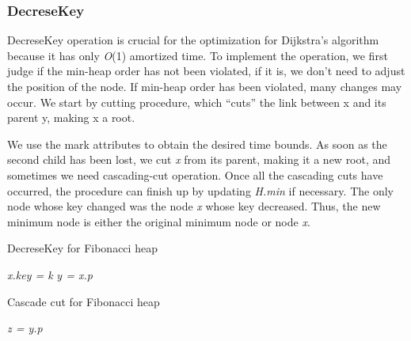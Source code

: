 \documentclass[12pt]{article}
\begin{document}
    \subsubsection{DecreseKey}
    DecreseKey operation is crucial for the optimization for Dijkstra's algorithm
    because it has only \emph{O}(1) amortized time. To implement the operation, 
    we first judge if the min-heap order has not been violated, if it is, we don't need to adjust the position of the node.
    If min-heap order has been violated, many changes may occur. We start by
    cutting procedure, which “cuts” the link between x and its parent y,
    making x a root.

    We use the mark attributes to obtain the desired time bounds.
    As soon as the second child has been lost, we cut \emph{x} from its parent, making it a new
    root, and sometimes we need cascading-cut operation. Once all the cascading 
    cuts have occurred, the procedure can finish up by updating \emph{H.min} if necessary. The only node whose key changed
    was the node \emph{x} whose key decreased. Thus, the new minimum node is either the
    original minimum node or node \emph{x}.

    \begin{algorithm}
        \caption{DecreseKey for Fibonacci heap}
        \LinesNumbered
        \emph{x.key = k}\;
        \emph{y = x.p}\;
    \end{algorithm}

    \begin{algorithm}
        \caption{Cascade cut for Fibonacci heap}
        \LinesNumbered
        \emph{z = y.p}\;
    \end{algorithm}
\end{document}
